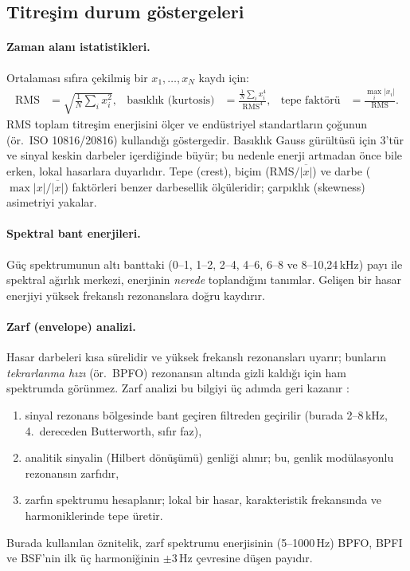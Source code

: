 \documentclass[11pt]{article}
\begin{document}
\subsection{Titreşim durum göstergeleri}
\paragraph{Zaman alanı istatistikleri.} Ortalaması sıfıra çekilmiş bir $x_1,\dots,x_N$ kaydı için:
\begin{align}
\text{RMS} &= \sqrt{\tfrac{1}{N}\textstyle\sum_i x_i^2}, &
\text{basıklık (kurtosis)} &= \frac{\tfrac{1}{N}\sum_i x_i^4}{\text{RMS}^4}, &
\text{tepe faktörü} &= \frac{\max_i |x_i|}{\text{RMS}}.
\end{align}
RMS toplam titreşim enerjisini ölçer ve endüstriyel standartların çoğunun (ör.\ ISO 10816/20816)
kullandığı göstergedir. Basıklık Gauss gürültüsü için 3'tür ve sinyal keskin darbeler içerdiğinde
büyür; bu nedenle enerji artmadan önce bile erken, lokal hasarlara duyarlıdır. Tepe (crest), biçim
($\text{RMS}/\overline{|x|}$) ve darbe ($\max|x|/\overline{|x|}$) faktörleri benzer darbesellik
ölçüleridir; çarpıklık (skewness) asimetriyi yakalar.

\paragraph{Spektral bant enerjileri.} Güç spektrumunun altı banttaki (0--1, 1--2, 2--4, 4--6, 6--8 ve
8--10,24\,kHz) payı ile spektral ağırlık merkezi, enerjinin \emph{nerede} toplandığını tanımlar.
Gelişen bir hasar enerjiyi yüksek frekanslı rezonanslara doğru kaydırır.

\paragraph{Zarf (envelope) analizi.} Hasar darbeleri kısa sürelidir ve yüksek frekanslı rezonansları
uyarır; bunların \emph{tekrarlanma hızı} (ör.\ BPFO) rezonansın altında gizli kaldığı için ham
spektrumda görünmez. Zarf analizi bu bilgiyi üç adımda geri kazanır \cite{randall2011}:
\begin{enumerate}
  \item sinyal rezonans bölgesinde bant geçiren filtreden geçirilir (burada 2--8\,kHz, 4.\ dereceden
        Butterworth, sıfır faz),
  \item analitik sinyalin (Hilbert dönüşümü) genliği alınır; bu, genlik modülasyonlu rezonansın
        zarfıdır,
  \item zarfın spektrumu hesaplanır; lokal bir hasar, karakteristik frekansında ve harmoniklerinde
        tepe üretir.
\end{enumerate}
Burada kullanılan öznitelik, zarf spektrumu enerjisinin (5--1000\,Hz) BPFO, BPFI ve BSF'nin ilk üç
harmoniğinin $\pm3$\,Hz çevresine düşen payıdır.
\end{document}
